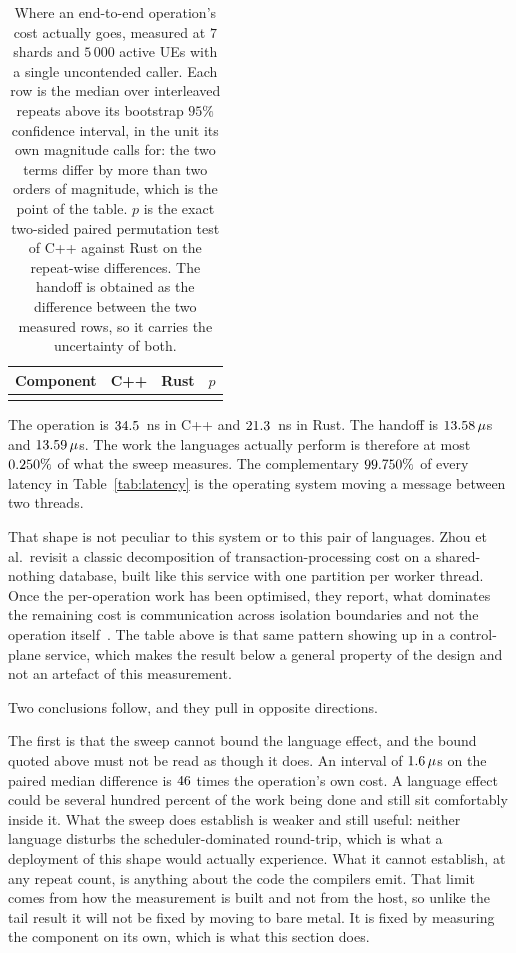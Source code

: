 \documentclass[english,oneside,a4paper,censored,csm,software-track-2020]{HYthesisML}
\begin{document}
\begin{table}[H]
\centering
\small
\caption[Where an end-to-end operation's cost actually goes]{Where an end-to-end operation's cost actually goes, measured at $7$ shards and
$5\,000$ active UEs with a single uncontended caller. Each row is the median over
\BudgetRepeats{} interleaved repeats above its bootstrap $95\%$ confidence interval, in the
unit its own magnitude calls for: the two terms differ by more than two orders of magnitude,
which is the point of the table. $p$ is the exact two-sided paired permutation test of C++
against Rust on the repeat-wise differences. The handoff is obtained as the difference between
the two measured rows, so it carries the uncertainty of both.\label{tab:budget}}
\begin{tabular}{@{}l r r r@{}}
\hline\hline
Component & C++ & Rust & $p$ \\
\hline
\\
\hline
\end{tabular}
\end{table}

The operation is $34.5$~ns in C++ and $21.3$~ns in Rust. The handoff is
$13.58\,\mu$s and $13.59\,\mu$s. The work the languages actually
perform is therefore at most $0.250\%$ of what the sweep measures. The
complementary $99.750\%$ of every latency in Table~\ref{tab:latency} is the
operating system moving a message between two threads.

That shape is not peculiar to this system or to this pair of languages. Zhou et al.\ revisit a
classic decomposition of transaction-processing cost on a shared-nothing database, built like
this service with one partition per worker thread. Once the per-operation work has been
optimised, they report, what dominates the remaining cost is communication across
isolation boundaries and not the operation itself~\cite{zhou2025oltp}. The table above is that
same pattern showing up in a control-plane service, which makes the result below a general
property of the design and not an artefact of this measurement.

Two conclusions follow, and they pull in opposite directions.

The first is that the sweep cannot bound the language effect, and the bound quoted above must
not be read as though it does. An interval of $1.6\,\mu$s on the paired median
difference is $46$ times the operation's own cost. A language effect could be
several hundred percent of the work being done and still sit comfortably inside it. What the sweep
does establish is weaker and still useful: neither language disturbs the
scheduler-dominated round-trip, which is what a deployment of this shape would actually
experience. What it cannot establish, at any repeat count, is anything about the code the
compilers emit. That limit comes from how the measurement is built and not from the host,
so unlike the tail result it will not be fixed by moving to bare metal. It is fixed by
measuring the component on its own, which is what this section does.
\end{document}

